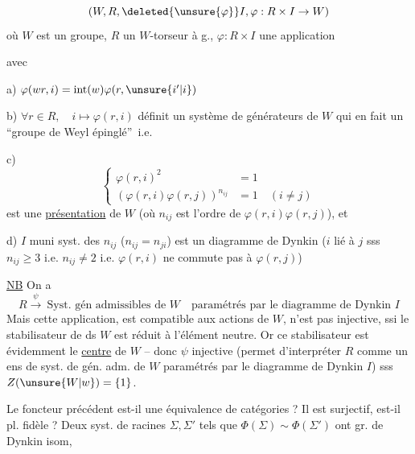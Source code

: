 \[
(W,R,\deleted{\unsure{\varphi}}I,\varphi:R\times I\to W)
\]
où $W$ est un groupe, $R$ un $W$-torseur à g.,  $\varphi:R\times I$ une  application

avec

a) $\varphi(wr,i)=\operatorname{int}(w)\varphi(r,\unsure{i'|i})$

b) $\forall r\in R,\quad i\mapsto\varphi(r,i)$ définit un système de générateurs de $W$ qui en fait  un \textquotedblleft groupe de Weyl épinglé\textquotedblright\ i.e.

c)
\[
\left\{\begin{aligned}\varphi(r,i)^2&=1\\(\varphi(r,i)\varphi(r,j))^{n_{ij}}&=1\quad(i\ne j)\end{aligned}\right.
\]
est une \uline{présentation} de $W$ (où $n_{ij}$ est l'ordre de $\varphi(r,i)\varphi(r,j)$), et

d) $I$ muni   syst. des $n_{ij}$ ($n_{ij}=n_{ji}$) est un diagramme de Dynkin ($i$ lié à $j$ sss $n_{ij}\geq 3$ i.e. $n_{ij}\ne2$ i.e. $\varphi(r,i)$ ne commute pas à $\varphi(r,j)$)

\uline{NB} On a
\[
 R\xrightarrow{\psi}\ \text{Syst. gén admissibles de }W
 \quad\text{paramétrés par le diagramme de Dynkin }I
\]
Mais cette application,  est   compatible aux actions de $W$, n'est pas  injective,   ssi le stabilisateur de  ds $W$ est réduit à l'élément neutre. Or ce stabilisateur est évidemment le \uline{centre} de $W$ -- donc $\psi$ injective (permet d'interpréter $R$ comme un ens de syst. de gén. adm. de $W$ paramétrés par le diagramme de Dynkin $I$)  sss $Z(\unsure{W|w})=\{1\}$.

Le foncteur précédent est-il une équivalence de catégories ? Il est   surjectif, est-il pl. fidèle ? Deux syst. de racines $\Sigma,\Sigma'$ tels que $\Phi(\Sigma)\sim\Phi(\Sigma')$ ont  gr. de Dynkin isom,

